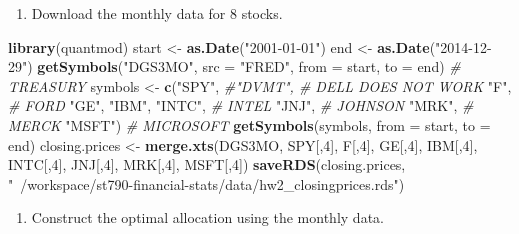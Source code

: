 \documentclass[11pt,]{article}
\newenvironment{Shaded}{\begin{snugshade}}{\end{snugshade}}
\newcommand{\CommentTok}[1]{\textcolor[rgb]{0.56,0.35,0.01}{\textit{#1}}}
\newcommand{\DataTypeTok}[1]{\textcolor[rgb]{0.13,0.29,0.53}{#1}}
\newcommand{\DecValTok}[1]{\textcolor[rgb]{0.00,0.00,0.81}{#1}}
\newcommand{\KeywordTok}[1]{\textcolor[rgb]{0.13,0.29,0.53}{\textbf{#1}}}
\newcommand{\NormalTok}[1]{#1}
\newcommand{\StringTok}[1]{\textcolor[rgb]{0.31,0.60,0.02}{#1}}
\providecommand{\tightlist}{%
\setlength{\itemsep}{0pt}\setlength{\parskip}{0pt}}
\begin{document}
\begin{enumerate}
\def\labelenumi{\arabic{enumi}.}
\tightlist
\item
  Download the monthly data for 8 stocks.
\end{enumerate}

\begin{Shaded}
\begin{Highlighting}[]
\KeywordTok{library}\NormalTok{(quantmod)}
\NormalTok{start <-}\StringTok{ }\KeywordTok{as.Date}\NormalTok{(}\StringTok{"2001-01-01"}\NormalTok{)}
\NormalTok{end <-}\StringTok{ }\KeywordTok{as.Date}\NormalTok{(}\StringTok{"2014-12-29"}\NormalTok{)}
\KeywordTok{getSymbols}\NormalTok{(}\StringTok{"DGS3MO"}\NormalTok{, }\DataTypeTok{src =} \StringTok{"FRED"}\NormalTok{, }\DataTypeTok{from =}\NormalTok{ start, }\DataTypeTok{to =}\NormalTok{ end) }\CommentTok{# TREASURY}
\NormalTok{symbols <-}\StringTok{ }\KeywordTok{c}\NormalTok{(}\StringTok{"SPY"}\NormalTok{, }
             \CommentTok{#"DVMT", # DELL DOES NOT WORK}
             \StringTok{"F"}\NormalTok{,  }\CommentTok{# FORD}
             \StringTok{"GE"}\NormalTok{, }
             \StringTok{"IBM"}\NormalTok{,}
             \StringTok{"INTC"}\NormalTok{, }\CommentTok{# INTEL}
             \StringTok{"JNJ"}\NormalTok{, }\CommentTok{# JOHNSON }
             \StringTok{"MRK"}\NormalTok{, }\CommentTok{# MERCK}
             \StringTok{"MSFT"}\NormalTok{) }\CommentTok{# MICROSOFT}
\KeywordTok{getSymbols}\NormalTok{(symbols, }\DataTypeTok{from =}\NormalTok{ start, }\DataTypeTok{to =}\NormalTok{ end) }
\NormalTok{closing.prices <-}\StringTok{ }\KeywordTok{merge.xts}\NormalTok{(DGS3MO,}
\NormalTok{                            SPY[,}\DecValTok{4}\NormalTok{], }
\NormalTok{                            F[,}\DecValTok{4}\NormalTok{], }
\NormalTok{                            GE[,}\DecValTok{4}\NormalTok{], }
\NormalTok{                            IBM[,}\DecValTok{4}\NormalTok{], }
\NormalTok{                            INTC[,}\DecValTok{4}\NormalTok{], }
\NormalTok{                            JNJ[,}\DecValTok{4}\NormalTok{], }
\NormalTok{                            MRK[,}\DecValTok{4}\NormalTok{], }
\NormalTok{                            MSFT[,}\DecValTok{4}\NormalTok{])}
\KeywordTok{saveRDS}\NormalTok{(closing.prices, }\StringTok{"~/workspace/st790-financial-stats/data/hw2_closingprices.rds"}\NormalTok{)}
\end{Highlighting}
\end{Shaded}

\begin{enumerate}
\def\labelenumi{\arabic{enumi}.}
\setcounter{enumi}{1}
\tightlist
\item
  Construct the optimal allocation using the monthly data.
\end{enumerate}
\end{document}
